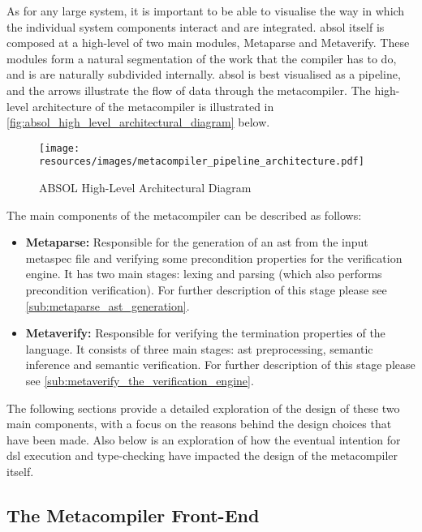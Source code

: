 As for any large system, it is important to be able to visualise the way in which the individual system components interact and are integrated. 
\gls{absol} itself is composed at a high-level of two main modules, Metaparse and Metaverify.
These modules form a natural segmentation of the work that the compiler has to do, and is are naturally subdivided internally.
\gls{absol} is best visualised as a pipeline, and the arrows illustrate the flow of data through the metacompiler.
The high-level architecture of the metacompiler is illustrated in \autoref{fig:absol_high_level_architectural_diagram} below.\\

\begin{figure}[!htb]
    \centering
    \texttt{[image: resources/images/metacompiler\_pipeline\_architecture.pdf]}
    \caption{ABSOL High-Level Architectural Diagram}
    \label{fig:absol_high_level_architectural_diagram}
\end{figure}

The main components of the metacompiler can be described as follows:
\begin{itemize}
    \item \textbf{Metaparse:} Responsible for the generation of an \gls{ast} from the input metaspec file and verifying some precondition properties for the verification engine. 
    It has two main stages: lexing and parsing (which also performs precondition verification). 
    For further description of this stage please see \autoref{sub:metaparse_ast_generation}.
    \item \textbf{Metaverify:} Responsible for verifying the termination properties of the language.
    It consists of three main stages: \gls{ast} preprocessing, semantic inference and semantic verification.
    For further description of this stage please see \autoref{sub:metaverify_the_verification_engine}.
\end{itemize}

The following sections provide a detailed exploration of the design of these two main components, with a focus on the reasons behind the design choices that have been made.
Also below is an exploration of how the eventual intention for \gls{dsl} execution and type-checking have impacted the design of the metacompiler itself. 

\subsection{The Metacompiler Front-End} %
\label{sub:the_metacompiler_front_end}

